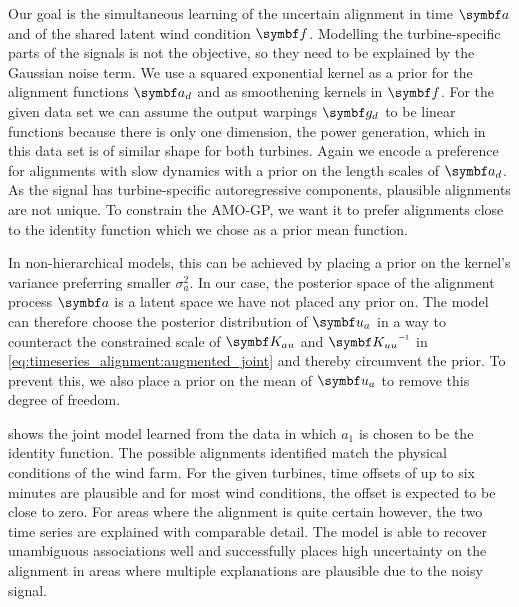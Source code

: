Our goal is the simultaneous learning of the uncertain alignment in time $\rv{a}$ and of the shared latent wind condition $\rv{f}$.
Modelling the turbine-specific parts of the signals is not the objective, so they need to be explained by the Gaussian noise term.
We use a squared exponential kernel as a prior for the alignment functions $\rv{a_d}$ and as smoothening kernels in $\rv{f}$.
For the given data set we can assume the output warpings $\rv{g_d}$ to be linear functions because there is only one dimension, the power generation, which in this data set is of similar shape for both turbines.
Again we encode a preference for alignments with slow dynamics with a prior on the length scales of $\rv{a_d}$.
As the signal has turbine-specific autoregressive components, plausible alignments are not unique.
To constrain the AMO-GP, we want it to prefer alignments close to the identity function which we chose as a prior mean function.

In non-hierarchical models, this can be achieved by placing a prior on the kernel's variance preferring smaller $\sigma_a^2$.
In our case, the posterior space of the alignment process $\rv{a}$ is a latent space we have not placed any prior on.
The model can therefore choose the posterior distribution of $\rv{u_a}$ in a way to counteract the constrained scale of $\mat{K_{au}}$ and $\mat{K_{uu}}\inv$ in \cref{eq:timeseries_alignment:augmented_joint} and thereby circumvent the prior.
To prevent this, we also place a prior on the mean of $\rv{u_a}$ to remove this degree of freedom.

 shows the joint model learned from the data in which $a_1$ is chosen to be the identity function.
The possible alignments identified match the physical conditions of the wind farm.
For the given turbines, time offsets of up to six minutes are plausible and for most wind conditions, the offset is expected to be close to zero.
For areas where the alignment is quite certain however, the two time series are explained with comparable detail.
The model is able to recover unambiguous associations well and successfully places high uncertainty on the alignment in areas where multiple explanations are plausible due to the noisy signal.

